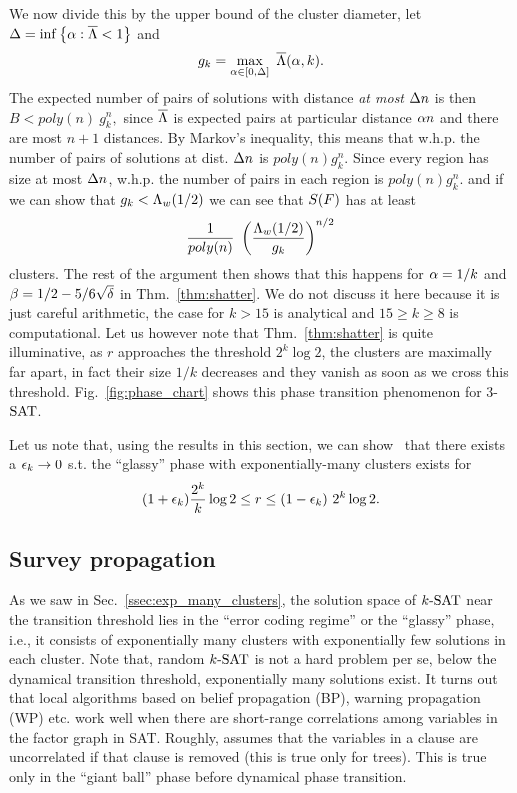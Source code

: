 \documentclass[letterpaper, 10pt, twocolumn, reqno]{amsart}
\begin{document}
We now divide this by the upper bound of the cluster diameter, let $\D = \inf \cbrac{\a: \bL < 1}$ and
$$g_k = \max_{\a \in [0,\D]}\ \bL(\a,k).$$
The expected
number of pairs of solutions with distance \emph{at most} $\D n$ is then
$B < poly(n)\ g_k^n,$
since $\bL$ is expected pairs at particular distance $\a n$
and there are most $n+1$ distances. By Markov's inequality, this means that w.h.p. the number of pairs of solutions at dist. $\D n$ is $poly(n) g_k^n$. Since
every region has size at most $\D n$, w.h.p. the number of pairs in each region is $poly(n) g_k^n$. and if we can show that $g_k < \L_w(1/2)$ we can
see that $\sf$ has at least
$$
\f{1}{poly(n)}\ \rbrac{\f{\L_w(1/2)}{g_k}}^{n/2}
$$
clusters. The rest of the argument then shows that this happens for $\a = 1/k$ and $\b = 1/2 - 5/6\sqrt{\d}$ in Thm.~\ref{thm:shatter}. We do not discuss it here because it is just careful arithmetic, the case for $k > 15$ is analytical and $15 \geq k \geq 8$ is computational. Let us however note that Thm.~\ref{thm:shatter} is quite illuminative, as $r$ approaches the threshold $2^k \log 2$, the clusters are maximally far apart, in fact their size $1/k$ decreases and they vanish as soon as we cross this threshold. Fig.~\ref{fig:phase_chart} shows this phase transition phenomenon for 3-$\SAT$.

Let us note that, using the results in this section, we can show~\cite{achlioptas2008algorithmic} that there exists a $\e_k \to 0$ s.t. the ``glassy'' phase with exponentially-many clusters exists for
$$
(1 +\e_k) \f{2^k}{k} \log 2 \leq r \leq (1-\e_k)\ 2^k \log 2.
$$

\subsection{Survey propagation}
\label{ssec:survey_propagation}

As we saw in Sec.~\ref{ssec:exp_many_clusters}, the solution space of $\ksat$ near the transition threshold lies in the ``error coding regime'' or the ``glassy'' phase, i.e., it consists of exponentially many clusters with exponentially few solutions in each cluster. Note that, random $\ksat$ is not a hard problem per se, below the dynamical transition threshold, exponentially many solutions exist. It turns out that local algorithms based on belief propagation (BP), warning propagation (WP) etc. work well when there are short-range correlations among variables in the factor graph in SAT. Roughly, assumes that the variables in a clause are uncorrelated if that clause is removed (this is true only for trees). This is true only in the ``giant ball'' phase before dynamical phase transition.
\end{document}
